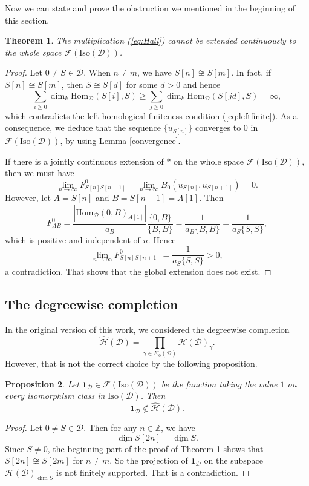 \documentclass[a4paper,12pt]{amsart}
\numberwithin{equation}{section}
\newtheorem{theorem}{Theorem}[section]
\newtheorem{proposition}[theorem]{Proposition}
\newcommand{\Hom}{\mathrm{Hom}}
\newcommand{\udv}{\underline{\dim}}
\newcommand{\Iso}{\mathrm{Iso}}
\newcommand{\1}{\mathbf{1}}
\begin{document}
Now we can state and prove the obstruction we mentioned in the beginning of this section.
\begin{theorem}\label{obstruction}
The multiplication (\ref{eq:Hall}) cannot be extended continuously to the whole space $\mathscr{F}(\Iso(\mathcal{D}))$.
\end{theorem}
\begin{proof}
    Let $0\neq S\in\mathcal{D}$. When $n\neq m$, we have $S[n]\not\cong S[m]$. In fact, if $S[n]\cong S[m]$, then $S\cong S[d]$ for some $d>0$ and hence
    \[\sum_{i\geq0}\dim_k\Hom_{\mathcal{D}}(S[i],S)\geqslant\sum_{j\geq0}\dim_k\Hom_{\mathcal{D}}(S[jd],S)=\infty,\]
    which contradicts the left homological finiteness condition (\ref{eq:leftfinite}). As a consequence, we deduce that the sequence $\{u_{S[n]}\}$ converges to $0$ in $\mathscr{F}(\Iso(\mathcal{D}))$, by using Lemma \ref{convergence}.
    
     If there is a jointly continuous extension of $*$ on the whole space $\mathscr{F}(\Iso(\mathcal{D}))$, then we must have
    \[\lim_{n\rightarrow\infty}F_{S[n]S[n+1]}^0=\lim_{n\rightarrow\infty}B_0(u_{S[n]},u_{S[n+1]})=0.\]
    However, let $A=S[n]$ and $B=S[n+1]=A[1]$. Then
    \[F_{AB}^0=\dfrac{|\Hom_{\mathcal{D}}(0,B)_{A[1]}|}{a_B}\dfrac{\{0,B\}}{\{B,B\}}=\dfrac{1}{a_B\{B,B\}}=\dfrac{1}{a_S\{S,S\}},\]
    which is positive and independent of $n$. Hence
    \[\lim_{n\rightarrow\infty}F_{S[n]S[n+1]}^0=\dfrac{1}{a_S\{S,S\}}>0,\]
    a contradiction. That shows that the global extension does not exist.
\end{proof}
\subsection{The degreewise completion}
In the original version \cite{GX2025} of this work, we considered the degreewise completion
\[\hat{\mathcal{H}}(\mathcal{D})=\prod_{\gamma\in K_0(\mathcal{D})}\mathcal{H}(\mathcal{D})_\gamma.\]
However, that is not the correct choice by the following proposition.
\begin{proposition}
    Let $\1_{\mathcal{D}}\in\mathscr{F}(\Iso(\mathcal{D}))$ be the function taking the value $1$ on every isomorphism class in $\Iso(\mathcal{D})$. Then
    \[\1_{\mathcal{D}}\notin\hat{\mathcal{H}}(\mathcal{D}).\]
\end{proposition}
\begin{proof}
Let $0\neq S\in\mathcal{D}$. Then for any $n\in\mathbb{Z}$, we have
\[\udv S[2n]=\udv S.\]
Since $S\neq 0$, the beginning part of the proof of Theorem \ref{obstruction} shows that $S[2n]\not\cong S[2m]$ for $n\neq m$. So the projection of $\1_{\mathcal{D}}$ on the subspace $\mathcal{H}(\mathcal{D})_{\udv S}$ is not finitely supported. That is a contradiction.
\end{proof}
\end{document}

